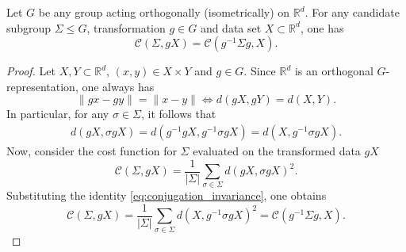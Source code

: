 \documentclass[10pt,a4paper]{amsart}
\def\br{{\mathbb{R}}}
\begin{document}
\begin{proposition}\label{prop:conjugation_invariance}
    Let $G$ be any group acting orthogonally (isometrically) on $\br^d$. For any candidate subgroup $\Sigma \leq G$, transformation $g \in G$ and data set $X \subset \br^d$, one has
\[
\mathcal C(\Sigma,gX) = \mathcal C(g^{-1} \Sigma g,X).
\]
\end{proposition}

\begin{proof}
Let $X,Y \subset \br^d$, $(x,y) \in X \times Y$ and $g \in G$.
Since $\br^d$ is an orthogonal $G$-representation, one always has
    \[
    \| gx - gy \| = \| x - y \| \iff d(gX,gY) = d(X,Y).
    \]
In particular, for any $\sigma \in \Sigma$, it follows that
\begin{align}\label{eq:conjugation_invariance}
    d(gX, \sigma gX) = d(g^{-1}g X,g^{-1}\sigma g X) = d(X, g^{-1}\sigma g X).
\end{align}
Now, consider the cost function for $\Sigma$ evaluated on the transformed data $gX$
\[
\mathcal C(\Sigma,gX) = \frac{1}{|\Sigma|} \sum_{\sigma \in \Sigma} d(gX,\sigma gX)^2.
\]
Substituting the identity \eqref{eq:conjugation_invariance}, one obtains
\[
\mathcal C(\Sigma, gX) = \frac{1}{|\Sigma|} \sum_{\sigma \in \Sigma} d(X,g^{-1}\sigma gX)^2 = \mathcal C(g^{-1}\Sigma g, X).
\]
\end{proof}
\end{document}
